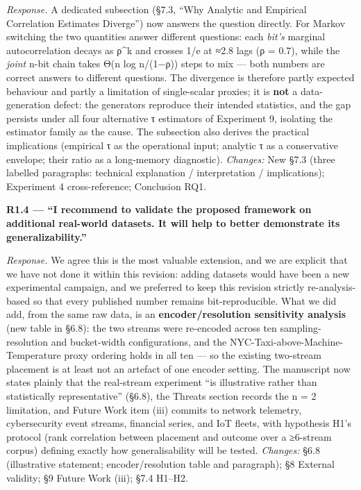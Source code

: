 \documentclass[
  11pt,
]{article}
\begin{document}
\emph{Response.} A dedicated subsection (§7.3, ``Why Analytic and
Empirical Correlation Estimates Diverge'') now answers the question
directly. For Markov switching the two quantities answer different
questions: each \emph{bit's} marginal autocorrelation decays as ρ\^{}k
and crosses 1/e at ≈2.8 lags (ρ = 0.7), while the \emph{joint} n-bit
chain takes Θ(n log n/(1−ρ)) steps to mix --- both numbers are correct
answers to different questions. The divergence is therefore partly
expected behaviour and partly a limitation of single-scalar proxies; it
is \textbf{not} a data-generation defect: the generators reproduce their
intended statistics, and the gap persists under all four alternative τ
estimators of Experiment 9, isolating the estimator family as the cause.
The subsection also derives the practical implications (empirical τ as
the operational input; analytic τ as a conservative envelope; their
ratio as a long-memory diagnostic). \emph{Changes:} New §7.3 (three
labelled paragraphs: technical explanation / interpretation /
implications); Experiment 4 cross-reference; Conclusion RQ1.

\textbf{R1.4 --- ``I recommend to validate the proposed framework on
additional real-world datasets. It will help to better demonstrate its
generalizability.''}

\emph{Response.} We agree this is the most valuable extension, and we
are explicit that we have not done it within this revision: adding
datasets would have been a new experimental campaign, and we preferred
to keep this revision strictly re-analysis-based so that every published
number remains bit-reproducible. What we did add, from the same raw
data, is an \textbf{encoder/resolution sensitivity analysis} (new table
in §6.8): the two streams were re-encoded across ten sampling-resolution
and bucket-width configurations, and the
NYC-Taxi-above-Machine-Temperature proxy ordering holds in all ten ---
so the existing two-stream placement is at least not an artefact of one
encoder setting. The manuscript now states plainly that the real-stream
experiment ``is illustrative rather than statistically representative''
(§6.8), the Threats section records the n = 2 limitation, and Future
Work item (iii) commits to network telemetry, cybersecurity event
streams, financial series, and IoT fleets, with hypothesis H1's protocol
(rank correlation between placement and outcome over a ≥6-stream corpus)
defining exactly how generalisability will be tested. \emph{Changes:}
§6.8 (illustrative statement; encoder/resolution table and paragraph);
§8 External validity; §9 Future Work (iii); §7.4 H1--H2.
\end{document}
